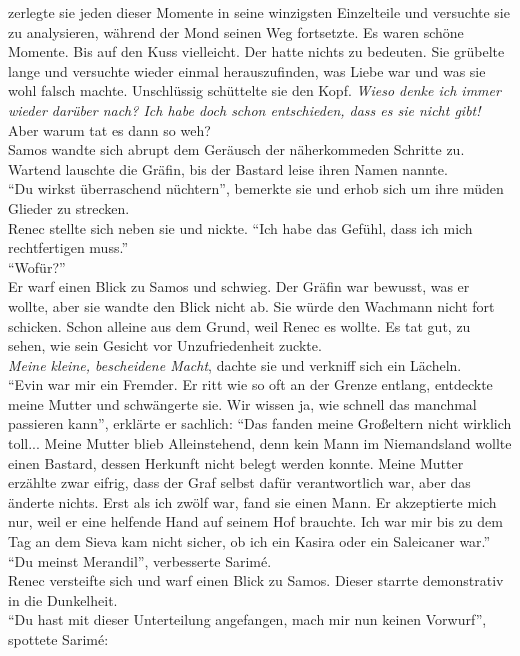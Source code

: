zerlegte sie jeden dieser Momente in seine winzigsten Einzelteile und versuchte sie zu analysieren, 
während der Mond seinen Weg fortsetzte. Es waren schöne Momente. Bis auf den Kuss vielleicht. Der 
hatte nichts zu bedeuten. Sie grübelte lange und versuchte wieder einmal herauszufinden, was Liebe 
war und was sie wohl falsch machte. Unschlüssig schüttelte sie den Kopf. \textit{Wieso denke ich 
immer wieder darüber nach? Ich habe doch schon entschieden, dass es sie nicht gibt!}\\
Aber warum tat es dann so weh?\\
Samos wandte sich abrupt dem Geräusch der näherkommeden Schritte zu. Wartend lauschte die Gräfin, 
bis der Bastard leise ihren Namen nannte.\\
``Du wirkst überraschend nüchtern'', bemerkte sie und erhob sich um ihre müden Glieder zu 
strecken.\\
Renec stellte sich neben sie und nickte. ``Ich habe das Gefühl, dass ich mich rechtfertigen 
muss.''\\
``Wofür?''\\
Er warf einen Blick zu Samos und schwieg. Der Gräfin war bewusst, was er wollte, aber sie wandte 
den Blick nicht ab. Sie würde den Wachmann nicht fort schicken. Schon alleine aus dem Grund, weil 
Renec es wollte. Es tat gut, zu sehen, wie sein Gesicht vor Unzufriedenheit zuckte.\\
\textit{Meine kleine, bescheidene Macht}, dachte sie und verkniff sich ein Lächeln.\\
``Evin war mir ein Fremder. Er ritt wie so oft an der Grenze entlang, entdeckte meine Mutter und 
schwängerte sie. Wir wissen ja, wie schnell das manchmal passieren kann'', erklärte er sachlich: 
``Das fanden meine Großeltern nicht wirklich toll... Meine Mutter blieb Alleinstehend, denn kein 
Mann im Niemandsland wollte einen Bastard, dessen Herkunft nicht belegt werden konnte. Meine Mutter 
erzählte zwar eifrig, dass der Graf selbst dafür verantwortlich war, aber das änderte nichts. Erst 
als ich zwölf war, fand sie einen Mann. Er akzeptierte mich nur, weil er eine helfende Hand auf 
seinem Hof brauchte. Ich war mir bis zu dem Tag an dem Sieva kam nicht sicher, ob ich ein Kasira 
oder ein Saleicaner war.''\\
``Du meinst Merandil'', verbesserte Sarimé.\\
Renec versteifte sich und warf einen Blick zu Samos. Dieser starrte demonstrativ in die 
Dunkelheit.\\
``Du hast mit dieser Unterteilung angefangen, mach mir nun keinen Vorwurf'', spottete Sarimé: 
